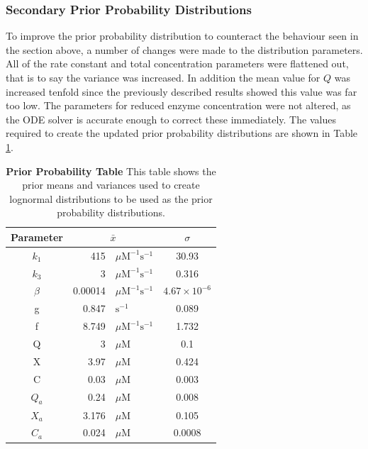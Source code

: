 
\subsubsection{Secondary Prior Probability Distributions}
To improve the prior probability distribution to counteract the behaviour seen in the section above, a number of changes were made to the distribution parameters. All of the rate constant and total concentration parameters were flattened out, that is to say the variance was increased. In addition the mean value for $Q$ was increased tenfold since the previously described results showed this value was far too low. The parameters for reduced enzyme concentration were not altered, as the ODE solver is accurate enough to correct these immediately. The values required to create the updated prior probability distributions are shown in Table \ref{tab:oxyProbstat1}.
\begin{table}[ht]%
\renewcommand{\arraystretch}{1.5}
\begin{center}
\begin{tabular}{crlc}
\toprule
\textbf{Parameter} & \multicolumn{2}{c}{${\bar{x}}$} & $\sigma$\\
\midrule
$k_1$ & 415 & $\mu \mathrm{M}^{-1}\mathrm{s}^{-1}$ & 30.93\\
$k_3$ & 3 & $\mu \mathrm{M}^{-1}\mathrm{s}^{-1}$ & 0.316\\
$\beta$ & 0.00014 & $\mu \mathrm{M}^{-1}\mathrm{s}^{-1}$ & $4.67\times 10^{-6}$\\
g & 0.847 & $\mathrm{s}^{-1}$ & 0.089\\
f & 8.749 & $\mu \mathrm{M}^{-1}\mathrm{s}^{-1}$ & 1.732\\
Q & 3 & $\mu \mathrm{M}$ & 0.1\\
X & 3.97 & $\mu \mathrm{M}$ & 0.424\\
C & 0.03 & $\mu \mathrm{M}$ & 0.003\\
$Q_a$ & 0.24 & $\mu \mathrm{M}$ & 0.008\\
$X_a$ & 3.176 & $\mu \mathrm{M}$ & 0.105\\
$C_a$ & 0.024 & $\mu \mathrm{M}$ & 0.0008\\
\bottomrule
\end{tabular}
\end{center}
\caption[Second Prior Probability Table]{{\bf Prior Probability Table} This table shows the prior means and variances used to create lognormal distributions to be used as the prior probability distributions.
\label{tab:oxyProbstat1}}
\end{table}
\afterpage{\clearpage}

